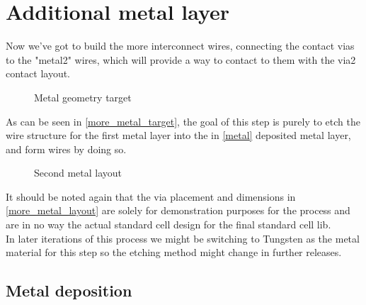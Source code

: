 \section{Additional metal layer}\label{more_metal}
Now we've got to build the more interconnect wires, connecting the contact vias to the "metal2" wires, which will provide a way to contact to them with the via2 contact layout.

\begin{figure}[H]
	\centering
	\begin{tikzpicture}[node distance = 3cm, auto, thick,scale=\CrossAndTopSectionBig, every node/.style={transform shape}]
		
	\end{tikzpicture}
	\begin{tikzpicture}[node distance = 3cm, auto, thick,scale=\CrossAndTopSectionBig, every node/.style={transform shape}]
		
	\end{tikzpicture}
	\caption{Metal geometry target}
	\label{more_metal_target}
\end{figure}

As can be seen in \autoref{more_metal_target}, the goal of this step is purely to etch the wire structure for the first metal layer into the in \autoref{metal} deposited metal layer, and form wires by doing so.

\begin{figure}[H]
	\centering
	\begin{tikzpicture}[node distance =1cm, auto, thick,scale=\VLSILayout, every node/.style={transform shape}]
		
	\end{tikzpicture}
	\caption{Second metal layout}
	\label{more_metal_layout}
\end{figure}

It should be noted again that the via placement and dimensions in \autoref{more_metal_layout} are solely for demonstration purposes for the process and are in no way the actual standard cell design for the final standard cell lib. \\

In later iterations of this process we might be switching to Tungsten as the metal material for this step so the etching method might change in further releases.

\newpage

\subsection{Metal deposition}\label{metal1_deposition}

